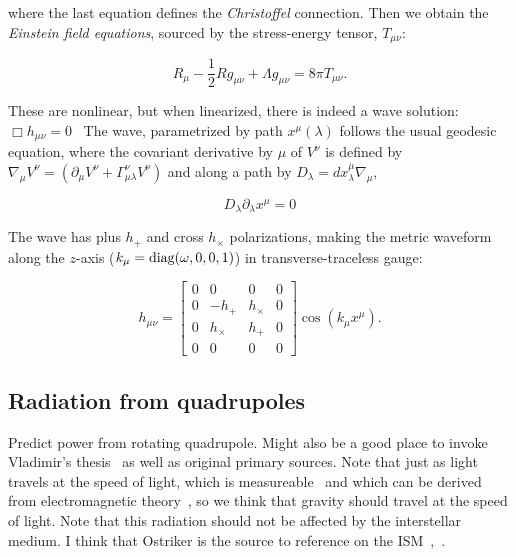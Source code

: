 \noindent where the last equation defines the \textit{Christoffel} connection. Then we obtain the \textit{Einstein field equations}, sourced by the stress-energy tensor, $T_{\mu\nu}$:

\begin{equation}
R_{\mu} - \frac{1}{2} R g_{\mu\nu} + \Lambda g_{\mu\nu} = 8 \pi T_{\mu\nu}.
\end{equation}

\noindent These are nonlinear, but when linearized, there is indeed a wave solution: $\Box h_{\mu\nu} = 0$~\cite{Carroll1997}
The wave, parametrized by path $x^\mu (\lambda)$ follows the usual geodesic equation, where the covariant derivative by $\mu$ of $V^\nu$ is defined by $\nabla_\mu V^\nu = (\partial_\mu V^\nu + \Gamma^\nu_{\mu\lambda} V^\nu)$ and along a path by $D_\lambda = dx^\mu_\lambda \nabla_\mu$,

\begin{equation}
D_\lambda \partial_\lambda x^\mu = 0
\end{equation}

The wave has plus $h_+$ and cross $h_\times$ polarizations, making the metric waveform along the $z$-axis ($k_\mu = \textup{diag}(\omega,0,0,1)$) in transverse-traceless gauge:

\begin{equation}
h_{\mu\nu} =
\left[
\begin{array}{cccc}
0 & 0 & 0 & 0\\
0 & -h_+ & h_\times & 0 \\
0 & h_\times & h_+ & 0\\
0 & 0 & 0 & 0
\end{array} \right] \cos \left(k_\mu x^\mu \right).
\end{equation}



        \subsection{Radiation from quadrupoles}
        \label{radiation}
  
            Predict power from rotating quadrupole. Might also be a good place to invoke Vladimir's thesis~\cite{DergachevThesis} as well as original primary sources. Note that just as light travels at the speed of light, which is measureable~\cite{CODATA} and which can be derived from electromagnetic theory~\cite{GriffithsE}, so we think that gravity should travel at the speed of light. Note that this radiation should not be affected by the interstellar medium. I think that Ostriker is the source to reference on the ISM~\cite{Caldwell1981},~\cite{McKee1977}.

